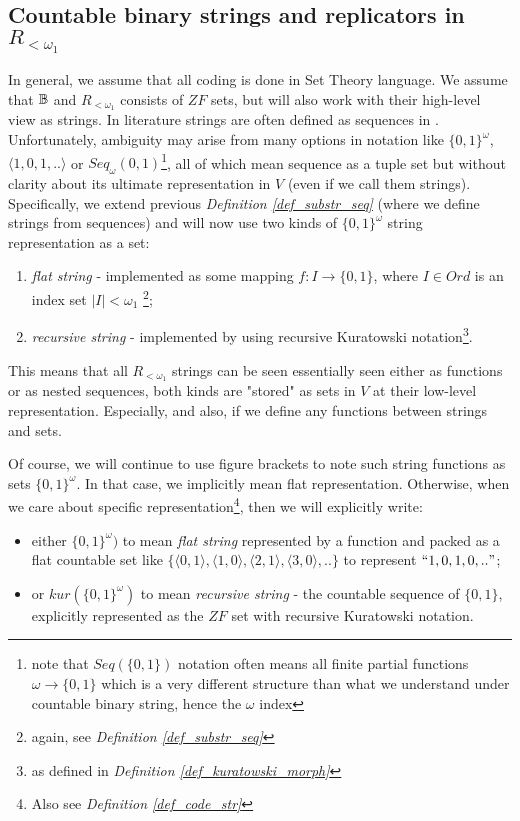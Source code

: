\subsection{Countable binary strings and replicators in $R_{<\omega_1}$}\label{subsection_countable_bin_str_and_rep}

In general, we assume that all coding is done in Set Theory language. We assume that $\mathbb{B}$ and $R_{<\omega_1}$ consists of $ZF$ sets, but will also work with their high-level view as strings. In literature strings are often defined as sequences in \cite{kunen1980set,jech2003set}. Unfortunately, ambiguity may arise from many options in notation like $\{0,1\}^\omega$, $\langle 1, 0, 1, .. \rangle$ or $Seq_\omega({0,1})$\footnote{note that $Seq(\{0,1\})$ notation often means all finite partial functions $\omega \to \{0,1\}$ which is a very different structure than what we understand under countable binary string, hence the $\omega$ index}, all of which mean sequence as a tuple set but without clarity about its ultimate representation in $V$ (even if we call them strings). Specifically, we extend previous \textit{Definition \ref{def_substr_seq}} (where we define strings from sequences) and will now use two kinds of $\{0,1\}^\omega$ string representation as a set: 
\begin{enumerate}
    \item \textit{flat string} - implemented as some mapping $f : I \to \{0,1\}$, where $I \in Ord$ is an index set $|I| < \omega_1$ \footnote{again, see \textit{Definition \ref{def_substr_seq}}}; 
    \item \textit{recursive string} - implemented by using recursive Kuratowski notation\footnote{as defined in \textit{Definition \ref{def_kuratowski_morph}}}. 
\end{enumerate}

This means that all $R_{<\omega_1}$ strings can be seen essentially seen either as functions or as nested sequences, both kinds are "stored" as sets in $V$ at their low-level representation. Especially, and also, if we define any functions between strings and sets. 

Of course, we will continue to use figure brackets to note such string functions as sets $\{0,1\}^\omega$. In that case, we implicitly mean flat representation. Otherwise, when we care about specific representation\footnote{Also see \textit{Definition \ref{def_code_str}}}, then we will explicitly write:
\begin{itemize}
    \item either $\{0,1\}^\omega)$ to mean \textit{flat string} represented by a function and packed as a flat countable set like $\{\langle0,1\rangle, \langle1,0\rangle, \langle2,1\rangle, \langle3,0\rangle, ..\}$ to represent $\text{``}1,0,1,0,..\text{''}$;
    \item or $kur(\{0,1\}^\omega)$ to mean \textit{recursive string} - the countable sequence of $\{0,1\}$, explicitly represented as the $ZF$ set with recursive Kuratowski notation.
\end{itemize}

